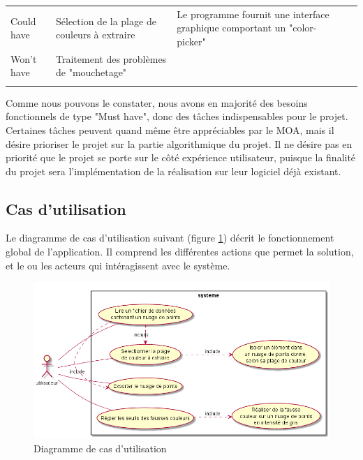 \documentclass[12pt,titlepage,french]{article}
\begin{document}
\noindent\begin{tabu} to \toprule
     &&&\\\toprule
Could have
& Sélection de la plage de couleurs à extraire
& Le programme fournit une interface graphique comportant un "color-picker"
& \\\midrule
Won't have
& Traitement des problèmes de "mouchetage"
&
&\\\bottomrule \\
\end{tabu}

Comme nous pouvons le constater, nous avons en majorité des besoins fonctionnels de type "Must have", donc des tâches indispensables pour le projet. Certaines tâches peuvent quand même être appréciables par le MOA, mais il désire prioriser le projet sur la partie algorithmique du projet. Il ne désire pas en priorité que le projet se porte sur le côté expérience utilisateur, puisque la finalité du projet sera l'implémentation de la réalisation sur leur logiciel déjà existant.

\subsection*{Cas d'utilisation}

Le diagramme de cas d'utilisation suivant (figure \ref{Diagramme de cas d'utilisation}) décrit le fonctionnement global de l'application.
Il comprend les différentes actions que permet la solution, et le ou les acteurs qui intéragissent avec le système.

\begin{figure} [!hbtp]
 \centering
    \caption{Diagramme de cas d'utilisation}
    \label{Diagramme de cas d'utilisation}
    \includegraphics[scale=0.6]{use_cases.png}
\end{figure}
\end{document}

